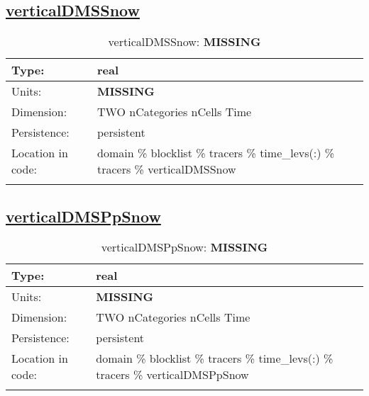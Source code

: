 \subsection[verticalDMSSnow]{\hyperref[sec:var_tab_tracers]{verticalDMSSnow}}
\label{subsec:var_sec_tracers_verticalDMSSnow}
\begin{center}
\begin{longtable}{| p{2.0in} | p{4.0in} |}
        \hline 
        Type: & real \\
        \hline 
        Units: & {\bf \color{red} MISSING} \\
        \hline 
        Dimension: & TWO nCategories nCells Time \\
        \hline 
        Persistence: & persistent \\
        \hline 
         Location in code: & domain \% blocklist \% tracers \% time\_levs(:) \% tracers \% verticalDMSSnow \\
         \hline 
    \caption{verticalDMSSnow: {\bf \color{red} MISSING}}
\end{longtable}
\end{center}
\subsection[verticalDMSPpSnow]{\hyperref[sec:var_tab_tracers]{verticalDMSPpSnow}}
\label{subsec:var_sec_tracers_verticalDMSPpSnow}
\begin{center}
\begin{longtable}{| p{2.0in} | p{4.0in} |}
        \hline 
        Type: & real \\
        \hline 
        Units: & {\bf \color{red} MISSING} \\
        \hline 
        Dimension: & TWO nCategories nCells Time \\
        \hline 
        Persistence: & persistent \\
        \hline 
         Location in code: & domain \% blocklist \% tracers \% time\_levs(:) \% tracers \% verticalDMSPpSnow \\
         \hline 
    \caption{verticalDMSPpSnow: {\bf \color{red} MISSING}}
\end{longtable}
\end{center}
